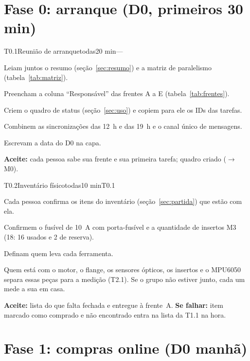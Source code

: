 \documentclass[11pt,a4paper]{article}
\newcommand{\flecha}{\ensuremath{\rightarrow}}
\begin{document}
\section{Fase 0: arranque (D0, primeiros 30 min)}
\label{sec:fase0}

\begin{tarefa}[critica]{T0.1}{Reunião de arranque}{todas}{20 min}{---}
\begin{passos}
  \item Leiam juntos o resumo (seção~\ref{sec:resumo}) e a matriz de paralelismo
    (tabela~\ref{tab:matriz}).
  \item Preencham a coluna ``Responsável'' das frentes A a E (tabela~\ref{tab:frentes}).
  \item Criem o quadro de status (seção~\ref{sec:uso}) e copiem para ele os IDs das tarefas.
  \item Combinem as sincronizações das 12~h e das 19~h e o canal único de mensagens.
  \item Escrevam a data do D0 na capa.
\end{passos}
\textbf{Aceite:} cada pessoa sabe sua frente e sua primeira tarefa; quadro criado
(\flecha{} M0).
\end{tarefa}

\begin{tarefa}[critica]{T0.2}{Inventário físico}{todas}{10 min}{T0.1}
\begin{passos}
  \item Cada pessoa confirma os itens do inventário (seção~\ref{sec:partida}) que estão com
    ela.
  \item Confirmem o fusível de 10~A com porta-fusível e a quantidade de insertos M3
    (18: 16 usados e 2 de reserva).
  \item Definam quem leva cada ferramenta.
  \item Quem está com o motor, o flange, os sensores ópticos, os insertos e o MPU6050 separa
    essas peças para a medição (T2.1). Se o grupo não estiver junto, cada um mede a sua em
    casa.
\end{passos}
\textbf{Aceite:} lista do que falta fechada e entregue à frente~A.\quad
\textbf{Se falhar:} item marcado como comprado e não encontrado entra na lista da T1.1 na
hora.
\end{tarefa}

\section{Fase 1: compras online (D0 manhã)}
\label{sec:fase1}
\end{document}
